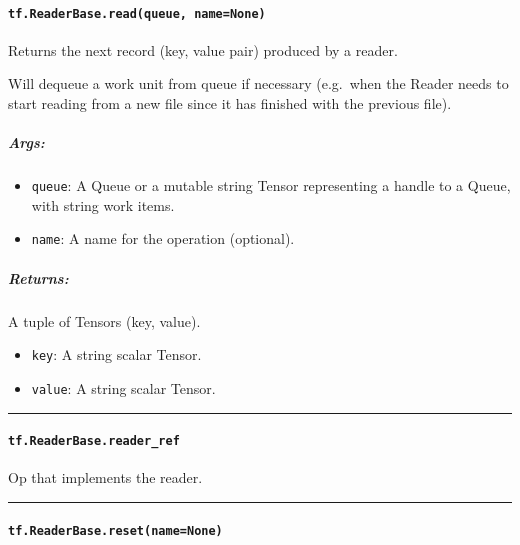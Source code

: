 \paragraph{\texorpdfstring{\texttt{tf.ReaderBase.read(queue,\ name=None)}
}{tf.ReaderBase.read(queue, name=None) }}\label{tf.readerbase.readqueue-namenone}

Returns the next record (key, value pair) produced by a reader.

Will dequeue a work unit from queue if necessary (e.g.~when the Reader
needs to start reading from a new file since it has finished with the
previous file).

\subparagraph{Args: }\label{args-4}

\begin{itemize}
\tightlist
\item
  \texttt{queue}: A Queue or a mutable string Tensor representing a
  handle to a Queue, with string work items.
\item
  \texttt{name}: A name for the operation (optional).
\end{itemize}

\subparagraph{Returns: }\label{returns-3}

A tuple of Tensors (key, value).

\begin{itemize}
\tightlist
\item
  \texttt{key}: A string scalar Tensor.
\item
  \texttt{value}: A string scalar Tensor.
\end{itemize}

\begin{center}\rule{0.5\linewidth}{\linethickness}\end{center}

\paragraph{\texorpdfstring{\texttt{tf.ReaderBase.reader\_ref}
}{tf.ReaderBase.reader\_ref }}\label{tf.readerbase.readerux5fref}

Op that implements the reader.

\begin{center}\rule{0.5\linewidth}{\linethickness}\end{center}

\paragraph{\texorpdfstring{\texttt{tf.ReaderBase.reset(name=None)}
}{tf.ReaderBase.reset(name=None) }}\label{tf.readerbase.resetnamenone}

